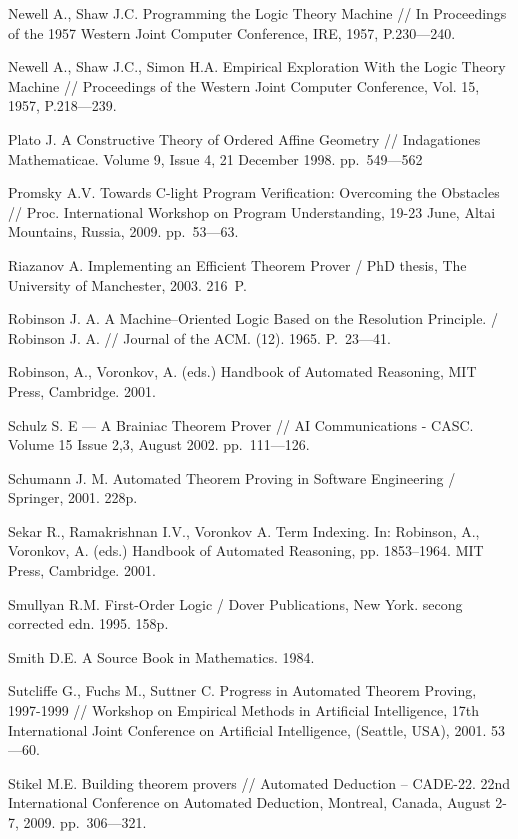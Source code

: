 \begin{thebibliography}{99}
 Newell A., Shaw J.C. Programming the Logic Theory Machine // In Proceedings of the 1957 Western Joint Computer Conference, IRE, 1957, P.230---240.

 Newell A., Shaw J.C., Simon H.A. Empirical Exploration With the Logic Theory Machine // Proceedings of the Western Joint Computer Conference, Vol. 15, 1957, P.218---239.

 Plato J. A Constructive Theory of Ordered Affine Geometry // Indagationes Mathematicae. Volume 9, Issue 4, 21 December 1998. pp.~549---562

 Promsky A.V. Towards C-light Program Verification: Overcoming the Obstacles // Proc. International Workshop on Program Understanding, 19-23 June, Altai Mountains, Russia, 2009. pp.~53---63.

 Riazanov A. Implementing an Efficient Theorem Prover /  PhD thesis, The University of Manchester, 2003. 216~P.

 Robinson J. A. A Machine--Oriented Logic Based on the Resolution Principle. / Robinson J. A. //  Journal of the ACM. (12). 1965. P.~23---41.

 Robinson, A., Voronkov, A. (eds.) Handbook of Automated Reasoning, MIT Press, Cambridge. 2001.

 Schulz S. E --- A Brainiac Theorem Prover // AI Communications - CASC. Volume 15 Issue 2,3, August 2002. pp.~111---126.

 Schumann J. M. Automated Theorem Proving in Software Engineering / Springer, 2001. 228p.

 Sekar R., Ramakrishnan I.V., Voronkov A. Term Indexing. In: Robinson, A., Voronkov, A. (eds.) Handbook of Automated Reasoning, pp. 1853--1964. MIT Press, Cambridge. 2001.

 Smullyan R.M. First-Order Logic / Dover Publications, New York. secong corrected edn. 1995. 158p.

 Smith D.E. A Source Book in Mathematics. 1984.

 Sutcliffe G., Fuchs M., Suttner C. Progress in Automated Theorem Proving, 1997-1999 // Workshop on Empirical Methods in Artificial Intelligence, 17th International Joint Conference on Artificial Intelligence, (Seattle, USA), 2001. 53---60.

 Stikel M.E. Building theorem provers // Automated Deduction – CADE-22. 22nd International Conference on Automated Deduction, Montreal, Canada, August 2-7, 2009. pp.~306---321.


\end{thebibliography}
